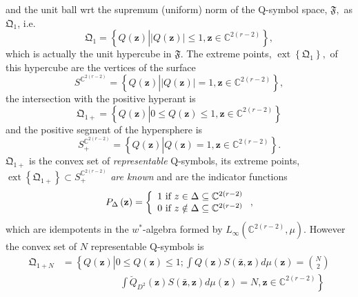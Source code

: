 \documentclass[aps,preprint]{revtex4}%
\begin{document}
and the unit ball wrt the supremum (uniform) norm of the Q-symbol space,
$\mathfrak{F},$ as $\mathfrak{Q}_{1}$, i.e.
\begin{equation}
\mathfrak{Q}_{1}=\left\{  Q\left(  \mathbf{z}\right)  \left\vert \left\vert
Q\left(  \mathbf{z}\right)  \right\vert \leq1,\mathbf{z\in}\mathbb{C}%
^{2\left(  r-2\right)  }\right.  \right\}  ,
\end{equation}
which is actually the unit hypercube in $\mathfrak{F}$. The extreme points,
$\operatorname*{ext}\left\{  \mathfrak{Q}_{1}\right\}  ,$ of this hypercube
are the vertices of the surface
\begin{equation}
S^{\mathbb{C}^{2\left(  r-2\right)  }}=\left\{  Q\left(  \mathbf{z}\right)
\left\vert \left\vert Q\left(  \mathbf{z}\right)  \right\vert =1,\mathbf{z\in
}\mathbb{C}^{2\left(  r-2\right)  }\right.  \right\}  ,
\end{equation}
the intersection with the positive hyperant is
\begin{equation}
\mathfrak{Q}_{1+}=\left\{  Q\left(  \mathbf{z}\right)  \left\vert 0\leq
Q\left(  \mathbf{z}\right)  \leq1,\mathbf{z\in}\mathbb{C}^{2\left(
r-2\right)  }\right.  \right\}
\end{equation}
and the positive segment of the hypersphere is
\begin{equation}
S_{+}^{\mathbb{C}^{2\left(  r-2\right)  }}=\left\{  Q\left(  \mathbf{z}%
\right)  \left\vert Q\left(  \mathbf{z}\right)  =1,\mathbf{z\in}%
\mathbb{C}^{2\left(  r-2\right)  }\right.  \right\}  .
\end{equation}
$\mathfrak{Q}_{1+}$ is the convex set of \emph{representable} Q-symbols, its
extreme points, $\operatorname*{ext}\left\{  \mathfrak{Q}_{1+}\right\}
\subset S_{+}^{\mathbb{C}^{2\left(  r-2\right)  }}$ \emph{are known }and are
the indicator functions%
\begin{equation}
P_{\Delta}\left(  \mathbf{z}\right)  =\left\{
\begin{array}
[c]{c}%
1\text{ if }z\in\Delta\subseteq\mathbb{C}^{2\left(  r-2\right)  }\\
0\text{ if }z\notin\Delta\subseteq\mathbb{C}^{2\left(  r-2\right)  }%
\end{array}
\right.  ,
\end{equation}
which are idempotents in the $w^{\ast}$-algebra formed by $L_{\infty}\left(
\mathbb{C}^{2\left(  r-2\right)  },\mu\right)  .$ However the convex set of
$N$ representable Q-symbols is
\begin{align}
\mathfrak{Q}_{1+N}  &  =\left\{  Q\left(  \mathbf{z}\right)  \left\vert 0\leq
Q\left(  \mathbf{z}\right)  \leq1;\int Q\left(  \mathbf{z}\right)  S\left(
\mathbf{\bar{z},z}\right)  d\mu\left(  \mathbf{z}\right)  =\binom{N}%
{2}\right.  \right. \nonumber\\
&  \qquad\qquad\qquad\left.  \int\breve{Q}_{D^{2}}\left(  \mathbf{z}\right)
S\left(  \mathbf{\bar{z},z}\right)  d\mu\left(  \mathbf{z}\right)
=N,\mathbf{z\in}\mathbb{C}^{2\left(  r-2\right)  }\right\}
\end{align}
\end{document}
